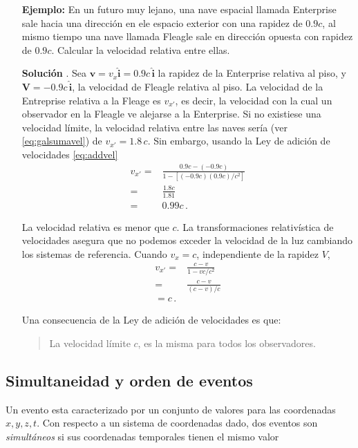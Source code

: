 \begin{itemize}
\item[\textbf{Ejemplo:}] En un futuro muy lejano, una nave espacial llamada Enterprise sale hacia una dirección en ele espacio exterior con una rapidez de $0.9c$, al mismo tiempo una nave llamada Fleagle sale en dirección opuesta con rapidez de $0.9c$. Calcular la velocidad relativa entre ellas.
\item[\textbf{Solución}].  Sea $\mathbf{v}=v_x\hat{\mathbf{i}}=0.9c\,\hat{\mathbf{i}}$ la rapidez de la Enterprise relativa al piso, y $\mathbf{V}=-0.9c\,\hat{\mathbf{i}}$, la velocidad de Fleagle relativa al piso. La velocidad de la Entreprise relativa a la Fleage es $v_{x'}$, es decir, la velocidad con la cual un observador en la Fleagle ve alejarse a la Enterprise. Si no existiese una velocidad límite, la velocidad relativa entre las naves sería (ver \eqref{eq:galsumavel}) de $v_{x'}=1.8\,c$. Sin embargo, usando la Ley de adición de velocidades \eqref{eq:addvel}
  \begin{align*}
    v_{x'}=&\frac{0.9c-(-0.9c)}{1-[(-0.9c)(0.9c)/c^2]}\nonumber\\
    =&\frac{1.8c}{1.81}\nonumber\\
    =&0.99c\,.
  \end{align*}

La velocidad relativa es menor que $c$. La transformaciones relativística de velocidades asegura que no podemos exceder la velocidad de la luz cambiando los sistemas de referencia. Cuando $v_{x}=c$, independiente de la rapidez $V$,
\begin{align*}
  v_{x'}=&\frac{c-v}{1-vc/c^2}\nonumber\\
  =&\frac{c-v}{(c-v)/c}\nonumber\\
  =c\,.
\end{align*}

Una consecuencia de la Ley de adición de velocidades es que:
\begin{quote}
  La velocidad límite $c$, es la misma para todos los observadores.
\end{quote}


\end{itemize}

\subsection{Simultaneidad y orden de eventos}

Un evento esta caracterizado por un conjunto de valores para las coordenadas $x,y,z,t$.  Con respecto a un sistema de coordenadas dado, dos eventos son \emph{simultáneos} si sus coordenadas temporales tienen el mismo valor

